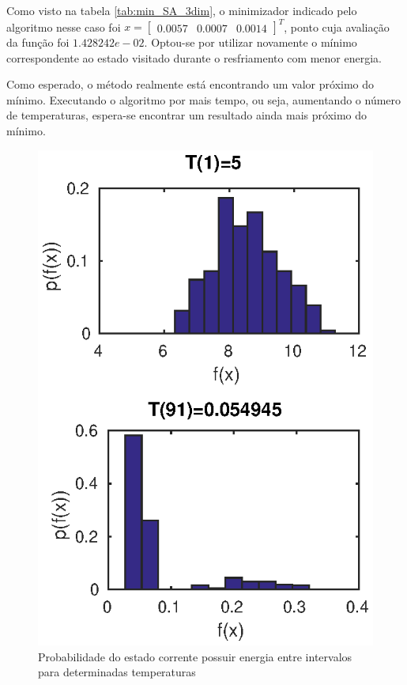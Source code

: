 \documentclass[conference,compsoc]{IEEEtran}
\begin{document}
Como visto na tabela \ref{tab:min_SA_3dim}, o minimizador indicado pelo algoritmo nesse caso foi $x= \begin{bmatrix}0.0057&0.0007&0.0014\end{bmatrix}^T$, ponto cuja avaliação da função foi $1.428242e-02$. Optou-se por utilizar novamente o mínimo correspondente ao estado visitado durante o resfriamento com menor energia.

Como esperado, o método realmente está encontrando um valor próximo do mínimo. Executando o algoritmo por mais tempo, ou seja, aumentando o número de temperaturas, espera-se encontrar um resultado ainda mais próximo do mínimo.

\begin{figure}[!htcb]
\centering
\includegraphics[scale=0.80]{SA_ackley_P_3dim.eps}
\caption{Probabilidade do estado corrente possuir energia entre intervalos para determinadas temperaturas}
\label{fig:SA_ackley_P_3dim}
\end{figure}
\end{document}
